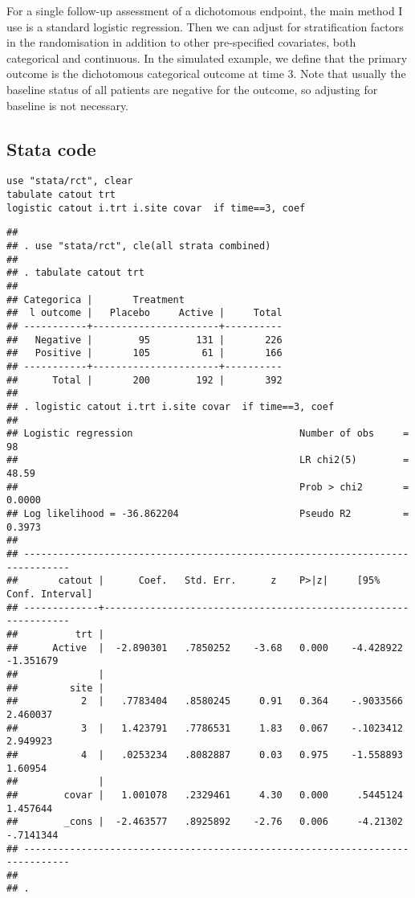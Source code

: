 \documentclass[]{book}
\begin{document}
For a single follow-up assessment of a dichotomous endpoint, the main method I use is a standard logistic regression. Then we can adjust for stratification factors in the randomisation in addition to other pre-specified covariates, both categorical and continuous. In the simulated example, we define that the primary outcome is the dichotomous categorical outcome at time 3. Note that usually the baseline status of all patients are negative for the outcome, so adjusting for baseline is not necessary.

\hypertarget{stata-code-1}{%
\subsection{Stata code}\label{stata-code-1}}

\begin{verbatim}
use "stata/rct", clear 
tabulate catout trt
logistic catout i.trt i.site covar  if time==3, coef
\end{verbatim}

\begin{verbatim}
## 
## . use "stata/rct", cle(all strata combined)
## 
## . tabulate catout trt
## 
## Categorica |       Treatment
##  l outcome |   Placebo     Active |     Total
## -----------+----------------------+----------
##   Negative |        95        131 |       226 
##   Positive |       105         61 |       166 
## -----------+----------------------+----------
##      Total |       200        192 |       392 
## 
## . logistic catout i.trt i.site covar  if time==3, coef
## 
## Logistic regression                             Number of obs     =         98
##                                                 LR chi2(5)        =      48.59
##                                                 Prob > chi2       =     0.0000
## Log likelihood = -36.862204                     Pseudo R2         =     0.3973
## 
## ------------------------------------------------------------------------------
##       catout |      Coef.   Std. Err.      z    P>|z|     [95% Conf. Interval]
## -------------+----------------------------------------------------------------
##          trt |
##      Active  |  -2.890301   .7850252    -3.68   0.000    -4.428922   -1.351679
##              |
##         site |
##           2  |   .7783404   .8580245     0.91   0.364    -.9033566    2.460037
##           3  |   1.423791   .7786531     1.83   0.067    -.1023412    2.949923
##           4  |   .0253234   .8082887     0.03   0.975    -1.558893     1.60954
##              |
##        covar |   1.001078   .2329461     4.30   0.000     .5445124    1.457644
##        _cons |  -2.463577   .8925892    -2.76   0.006     -4.21302   -.7141344
## ------------------------------------------------------------------------------
## 
## .
\end{verbatim}
\end{document}
